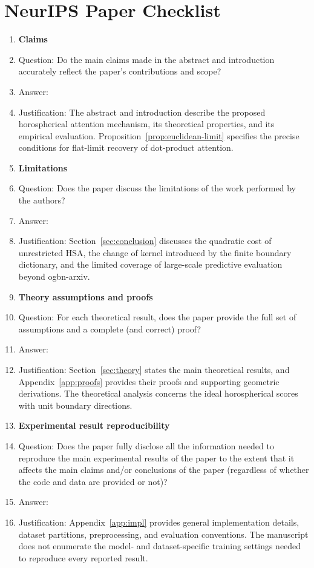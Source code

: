 \section*{NeurIPS Paper Checklist}

\begin{enumerate}

\item {\bf Claims}
    \item[] Question: Do the main claims made in the abstract and introduction accurately reflect the paper's contributions and scope?
    \item[] Answer: \answerYes{}
    \item[] Justification: The abstract and introduction describe the proposed
    horospherical attention mechanism, its theoretical properties, and its
    empirical evaluation. Proposition~\ref{prop:euclidean-limit} specifies
    the precise conditions for flat-limit recovery of dot-product attention.

\item {\bf Limitations}
    \item[] Question: Does the paper discuss the limitations of the work performed by the authors?
    \item[] Answer: \answerYes{}
    \item[] Justification: Section~\ref{sec:conclusion} discusses the quadratic cost of unrestricted
    HSA, the change of kernel introduced by the finite boundary dictionary,
    and the limited coverage of large-scale predictive evaluation beyond
    ogbn-arxiv.

\item {\bf Theory assumptions and proofs}
    \item[] Question: For each theoretical result, does the paper provide the full set of assumptions and a complete (and correct) proof?
    \item[] Answer: \answerYes{}
    \item[] Justification: Section~\ref{sec:theory} states the main theoretical
    results, and Appendix~\ref{app:proofs} provides their proofs and supporting
    geometric derivations. The theoretical analysis concerns the ideal
    horospherical scores with unit boundary directions.

\item {\bf Experimental result reproducibility}
    \item[] Question: Does the paper fully disclose all the information needed to reproduce the main experimental results of the paper to the extent that it affects the main claims and/or conclusions of the paper (regardless of whether the code and data are provided or not)?
    \item[] Answer: \answerYes{}
    \item[] Justification: Appendix~\ref{app:impl} provides general implementation details, dataset partitions, preprocessing, and evaluation conventions. The manuscript does not enumerate the model- and dataset-specific training settings needed to reproduce every reported result.


\end{enumerate}
